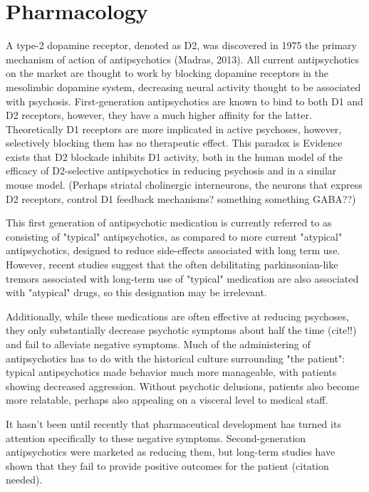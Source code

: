 \documentclass[12pt,twoside]{reedthesis}
\begin{document}
	\section{Pharmacology} 
	A type-2 dopamine receptor, denoted as D2, was discovered in 1975 the primary mechanism of action of antipsychotics (Madras, 2013).  
	All current antipsychotics on the market are thought to work by blocking dopamine receptors in the mesolimbic dopamine system, decreasing neural activity thought to be associated with psychosis. First-generation antipsychotics are known to bind to both D1 and D2 receptors, however, they have a much higher affinity for the latter. Theoretically D1 receptors are more implicated in active psychoses, however, selectively blocking them has no therapeutic effect. This paradox is 
	Evidence exists that D2 blockade inhibits D1 activity, both in the human model of the efficacy of D2-selective antipsychotics in reducing psychosis and in a similar mouse model. 
	(Perhaps striatal cholinergic interneurons, the neurons that express D2 receptors, control D1 feedback mechanisms? something something GABA??)
	
	This first generation of antipsychotic medication is currently referred to as consisting of "typical" antipsychotics, as compared to more current "atypical" antipsychotics, designed to reduce side-effects associated with long term use. However, recent studies suggest that the often debilitating parkinsonian-like tremors associated with long-term use of "typical" medication are also associated with "atypical" drugs, so this designation may be irrelevant. 
	
	Additionally, while these medications are often effective at reducing psychoses, they only substantially decrease psychotic symptoms about half the time \color{red}(cite!!)\color{black} and fail to alleviate negative symptoms. Much of the administering of antipsychotics has to do with the historical culture surrounding "the patient": typical antipsychotics made behavior much more manageable, with patients showing decreased aggression. Without psychotic delusions, patients also become more relatable, perhaps also appealing on a visceral level to medical staff. 

	It hasn't been until recently that pharmaceutical development has turned its attention specifically to these negative symptoms. Second-generation antipsychotics were marketed as reducing them, but long-term studies have shown that they fail to provide positive outcomes for the patient \color{red}(citation needed)\color{black}. 
	
\end{document}
